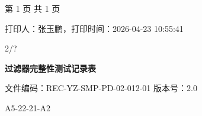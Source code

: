 \documentclass[UTF8,10pt,a4paper,fontset=fandol]{ctexart}
\newcommand{\handwritten}[1]{#1}
\begin{document}
\vfill

\begin{center}
第 1 页 共 1 页

打印人：张玉鹏，打印时间：2026-04-23 10:55:41
\end{center}

\handwritten{2/?}

\newpage

\begin{center}
\textbf{过滤器完整性测试记录表}
\end{center}

\noindent
文件编码：REC-YZ-SMP-PD-02-012-01 \qquad 版本号：2.0

\handwritten{A5-22-21-A2}
\end{document}
